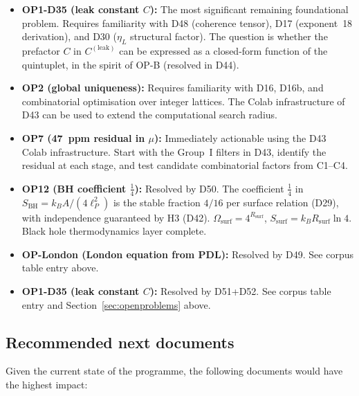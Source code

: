 \documentclass[11pt,a4paper]{article}
\theoremstyle{plain}
\theoremstyle{definition}
\theoremstyle{remark}
\newcommand{\Rsurf}{R_{\mathrm{surf}}}
\newcommand{\SBH}{S_{\mathrm{BH}}}
\begin{document}
\begin{itemize}
\item \textbf{OP1-D35 (leak constant $C$):} The most significant remaining foundational problem. Requires familiarity with D48 (coherence tensor), D17 (exponent~18 derivation), and D30 ($\eta_L$ structural factor). The question is whether the prefactor $C$ in $C^{(\mathrm{leak})}$ can be expressed as a closed-form function of the quintuplet, in the spirit of OP-B (resolved in D44).
\item \textbf{OP2 (global uniqueness):} Requires familiarity with D16, D16b, and combinatorial optimisation over integer lattices. The Colab infrastructure of D43 can be used to extend the computational search radius.
\item \textbf{OP7 (47~ppm residual in $\mu$):} Immediately actionable using the D43 Colab infrastructure. Start with the Group~I filters in D43, identify the residual at each stage, and test candidate combinatorial factors from C1--C4.
\item \textbf{OP12 (BH coefficient $\tfrac{1}{4}$):} \textcolor{proofblue}{Resolved by D50.} The coefficient $\tfrac{1}{4}$ in $\SBH = k_B A/(4\ell_P^2)$ is the stable fraction $4/16$ per surface relation (D29), with independence guaranteed by H3 (D42). $\Omega_{\mathrm{surf}} = 4^{\Rsurf}$, $S_{\mathrm{surf}} = k_B\Rsurf\ln 4$. Black hole thermodynamics layer complete.
\item \textbf{OP-London (London equation from PDL):} \textcolor{proofblue}{Resolved by D49.} See corpus table entry above.
\item \textbf{OP1-D35 (leak constant $C$):} \textcolor{proofblue}{Resolved by D51+D52.} See corpus table entry and Section~\ref{sec:openproblems} above.
\end{itemize}

\subsection{Recommended next documents}
\label{subsec:nextdocs}
Given the current state of the programme, the following documents would have the highest impact:
\end{document}
